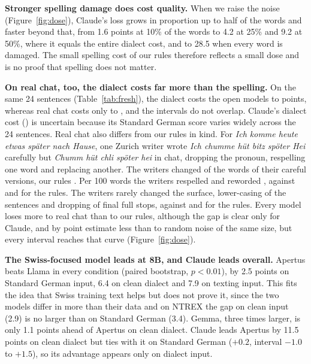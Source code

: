 \documentclass[11pt]{article}
\begin{document}
\textbf{Stronger spelling damage does cost quality.} When we raise the noise
(Figure~\ref{fig:dose}), Claude's loss grows in proportion up to half of the words and faster beyond
that, from 1.6 points at 10\% of the words to 4.2 at 25\% and 9.2 at 50\%, where it equals the
entire dialect cost, and to 28.5 when every word is damaged. The small spelling cost of our rules
therefore reflects a small dose and is no proof that spelling does not matter.

\begin{table}[t]
\centering
\small
\setlength{\tabcolsep}{2.5pt}

\caption{Fresh set (\FreshWriters{} writers $\times$ 24 sentences). Costs are chrF lost from Standard
German to careful input (dialect) and from careful input to real chat or to our rules. $\pm$: 95\% CI.}
\label{tab:fresh}
\end{table}

\textbf{On real chat, too, the dialect costs far more than the spelling.} On the same 24
sentences (Table~\ref{tab:fresh}), the dialect costs the open models \FreshDialectOpenMin{} to
\FreshDialectOpenMax{} points, whereas real chat costs only \FreshRealMin{} to \FreshRealMax{}, and
the intervals do not overlap. Claude's dialect cost (\ClaudeFreshDialect) is uncertain because its
Standard German score varies widely across the 24 sentences. Real chat also differs
from our rules in kind. For \emph{Ich komme heute etwas später nach Hause}, one Zurich writer
wrote \emph{Ich chumme hüt bitz spöter Hei} carefully but \emph{Chumm hüt chli spöter hei} in chat,
dropping the pronoun, respelling one word and replacing another. The writers changed \FreshChatChanged{} of the words of their careful
versions, our rules \FreshRulesChanged{}. Per 100 words the writers respelled \ChatRespelled{} and
reworded \ChatReworded{}, against
\RulesRespelled{} and \RulesReworded{} for the rules. The writers rarely changed the surface,
lower-casing \ChatLowered{} of the sentences and dropping \ChatEndDropped{} of final full stops,
against \RulesLowered{} and \RulesEndDropped{} for the rules. Every model loses
more to real chat than to our rules, although the gap is clear only for Claude, and by point estimate
less than to random noise of the same size, but every interval reaches that curve
(Figure~\ref{fig:dose}).

\textbf{The Swiss-focused model leads at 8B, and Claude leads overall.} Apertus beats Llama in
every condition (paired bootstrap, $p < 0.01$), by 2.5 points on Standard German input, 6.4 on clean
dialect and 7.9 on texting input. This fits the idea that Swiss training text helps but does not
prove it, since the two models differ in more than their data and on NTREX the gap on clean input
(2.9) is no larger than on Standard German (3.4). Gemma, three times larger, is only 1.1
points ahead of Apertus on clean dialect. Claude leads Apertus by 11.5 points on clean dialect but
ties with it on Standard German ($+0.2$, interval $-1.0$ to $+1.5$), so its advantage appears only on
dialect input.
\end{document}

